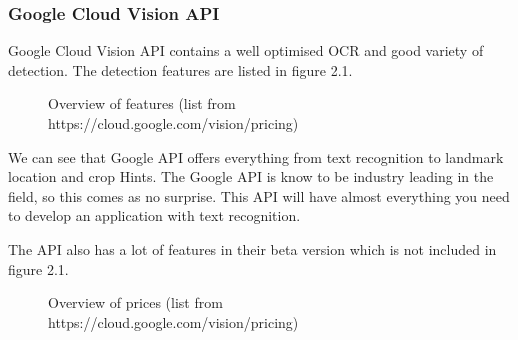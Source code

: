 \subsubsection{Google Cloud Vision API}\label{subsubsec:API_Google}

Google Cloud Vision API contains a well optimised OCR and good variety of detection.
The detection features are listed in figure 2.1.

\begin{figure}[h]
    \caption{Overview of features (list from https://cloud.google.com/vision/pricing)}
    \label{fig:figure1}

\end{figure}

We can see that Google API offers everything from text recognition to landmark location and crop Hints.
The Google API is know to be industry leading in the field, so this comes as no surprise.
This API will have almost everything you need to develop an application with text recognition.

The API also has a lot of features in their beta version which is not included in figure 2.1.
\clearpage


\begin{figure}[h]
    \caption{Overview of prices (list from https://cloud.google.com/vision/pricing)}
    \label{fig:figure2}

\end{figure}

